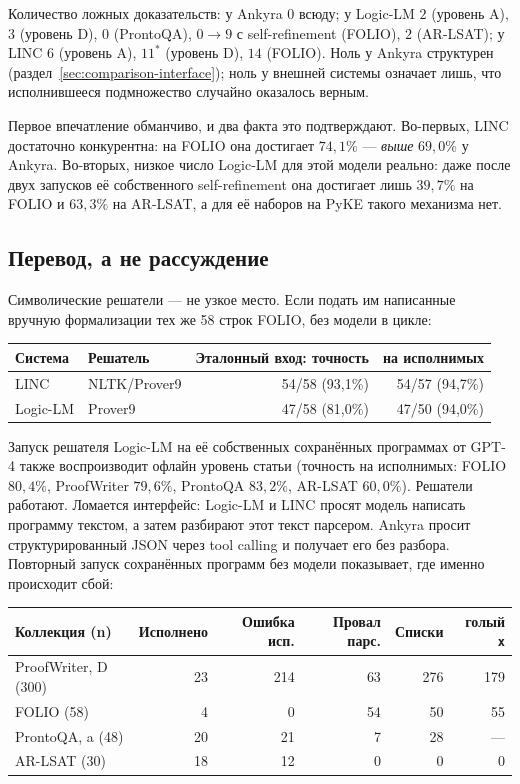 \documentclass[11pt,a4paper]{article}
\begin{document}
Количество ложных доказательств: у Ankyra $0$ всюду; у Logic-LM $2$ (уровень A), $3$ (уровень D), $0$ (ProntoQA), $0\to9$ с self-refinement (FOLIO),
$2$ (AR-LSAT); у LINC $6$ (уровень A), $11^{\ast}$ (уровень D), $14$ (FOLIO). Ноль у Ankyra структурен (раздел~\ref{sec:comparison-interface});
ноль у внешней системы означает лишь, что исполнившееся подмножество случайно оказалось верным.

Первое впечатление обманчиво, и два факта это подтверждают. Во-первых, LINC достаточно конкурентна: на FOLIO она достигает $74{,}1\%$ — \emph{выше} $69{,}0\%$
у Ankyra. Во-вторых, низкое число Logic-LM для этой модели реально: даже после двух запусков её собственного self-refinement она достигает лишь $39{,}7\%$
на FOLIO и $63{,}3\%$ на AR-LSAT, а для её наборов на PyKE такого механизма нет.

\subsection{Перевод, а не рассуждение}
\label{sec:comparison-translation}

Символические решатели — не узкое место. Если подать им написанные вручную формализации тех же 58 строк FOLIO, без модели в цикле:

\begin{center}
\small
\begin{tabular}{llrr}
\toprule
\textbf{Система} & \textbf{Решатель} & \textbf{Эталонный вход: точность} & \textbf{на исполнимых} \\
\midrule
LINC & NLTK/Prover9 & 54/58 (93{,}1\%) & 54/57 (94{,}7\%) \\
Logic-LM & Prover9 & 47/58 (81{,}0\%) & 47/50 (94{,}0\%) \\
\bottomrule
\end{tabular}
\end{center}

Запуск решателя Logic-LM на её собственных сохранённых программах от GPT-4 также воспроизводит офлайн уровень статьи (точность на исполнимых:
FOLIO $80{,}4\%$, ProofWriter $79{,}6\%$, ProntoQA $83{,}2\%$, AR-LSAT $60{,}0\%$). Решатели работают. Ломается интерфейс: Logic-LM и LINC
просят модель написать программу текстом, а затем разбирают этот текст парсером. Ankyra просит структурированный JSON через tool calling
и получает его без разбора. Повторный запуск сохранённых программ без модели показывает, где именно происходит сбой:

\begin{center}
\footnotesize
\setlength{\tabcolsep}{4pt}
\begin{tabular}{lrrrrr}
\toprule
\textbf{Коллекция (n)} & \textbf{Исполнено} & \textbf{Ошибка исп.} & \textbf{Провал парс.} & \textbf{Списки} & \textbf{голый \texttt{x}} \\
\midrule
ProofWriter, D (300) & 23 & 214 & 63 & 276 & 179 \\
FOLIO (58) & 4 & 0 & 54 & 50 & 55 \\
ProntoQA, a (48) & 20 & 21 & 7 & 28 & --- \\
AR-LSAT (30) & 18 & 12 & 0 & 0 & 0 \\
\bottomrule
\end{tabular}
\end{center}
\end{document}
